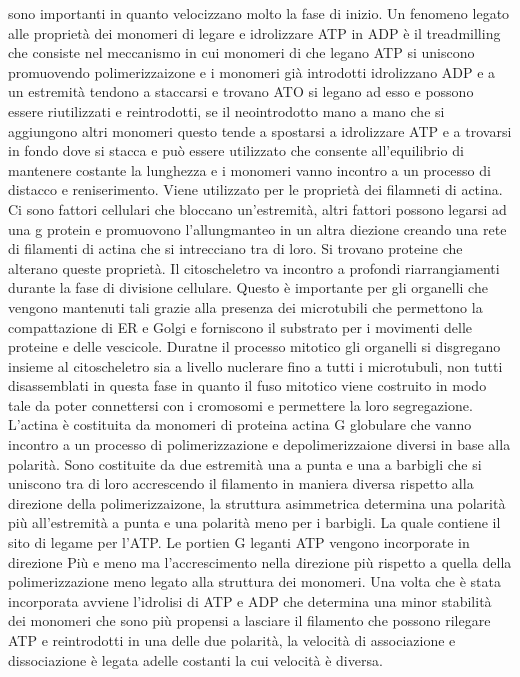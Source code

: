 sono importanti in quanto velocizzano molto la fase di inizio. Un fenomeno legato alle propriet\`a dei monomeri di legare e idrolizzare ATP in ADP \`e il treadmilling che consiste nel
meccanismo in cui monomeri di che legano ATP si uniscono promuovendo polimerizzaizone e i monomeri gi\`a introdotti idrolizzano ADP e a un estremit\`a tendono a staccarsi e trovano ATO
si legano ad esso e possono essere riutilizzati e reintrodotti, se il neointrodotto mano a mano che si aggiungono altri monomeri questo tende a spostarsi a idrolizzare ATP e a trovarsi 
in fondo dove si stacca e pu\`o essere utilizzato che consente all'equilibrio di mantenere costante la lunghezza e i monomeri vanno incontro a un processo di distacco e reniserimento. 
Viene utilizzato per le propriet\`a dei filamneti di actina. Ci sono fattori cellulari che bloccano un'estremit\`a, altri fattori possono legarsi ad una g protein e promuovono 
l'allungmanteo in un altra diezione creando una rete di filamenti di actina che si intrecciano tra di loro. Si trovano proteine che alterano queste propriet\`a. Il citoscheletro
va incontro a profondi riarrangiamenti durante la fase di divisione cellulare. Questo \`e importante per gli organelli che vengono mantenuti tali grazie alla presenza dei microtubili
che permettono la compattazione di ER e Golgi e forniscono il substrato per i movimenti delle proteine e delle vescicole. Duratne il processo mitotico gli organelli si disgregano insieme
al citoscheletro sia a livello nuclerare fino a tutti i microtubuli, non tutti disassemblati in questa fase in quanto il fuso mitotico viene costruito in modo tale da poter connettersi
con i cromosomi e permettere la loro segregazione. L'actina \`e costituita da monomeri di proteina actina G globulare che vanno incontro a un processo di polimerizzazione e 
depolimerizzaione diversi in base alla polarit\`a. Sono costituite da due estremit\`a una a punta e una a barbigli che si uniscono tra di loro accrescendo il filamento in maniera diversa
rispetto alla direzione della polimerizzaizone, la struttura asimmetrica determina una polarit\`a pi\`u all'estremit\`a a punta e una polarit\`a meno per i barbigli. La quale contiene
il sito di legame per l'ATP. Le portien G leganti ATP vengono incorporate in direzione Pi\`u e meno ma l'accrescimento nella direzione pi\`u rispetto a quella della polimerizzazione meno
legato alla struttura dei monomeri. Una volta che \`e stata incorporata avviene l'idrolisi di ATP e ADP che determina una minor stabilit\`a dei monomeri che sono pi\`u propensi a lasciare
il filamento che possono rilegare ATP e reintrodotti in una delle due polarit\`a, la velocit\`a di associazione e dissociazione \`e legata adelle costanti la cui velocit\`a \`e diversa. 
